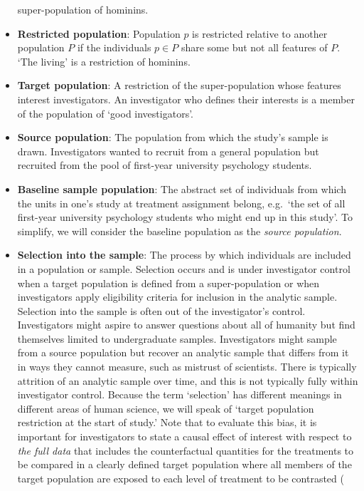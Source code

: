 \documentclass[
  single column]{article}
\begin{document}
\begin{itemize}
  super-population of hominins.
\item
  \textbf{Restricted population}: Population \(p\) is restricted
  relative to another population \(P\) if the individuals \(p \in P\)
  share some but not all features of \(P\). `The living' is a
  restriction of hominins.
\item
  \textbf{Target population}: A restriction of the super-population
  whose features interest investigators. An investigator who defines
  their interests is a member of the population of `good investigators'.
\item
  \textbf{Source population}: The population from which the study's
  sample is drawn. Investigators wanted to recruit from a general
  population but recruited from the pool of first-year university
  psychology students.
\item
  \textbf{Baseline sample population}: The abstract set of individuals
  from which the units in one's study at treatment assignment belong,
  e.g.~`the set of all first-year university psychology students who
  might end up in this study'. To simplify, we will consider the
  baseline population as the \emph{source population}.
\item
  \textbf{Selection into the sample}: The process by which individuals
  are included in a population or sample. Selection occurs and is under
  investigator control when a target population is defined from a
  super-population or when investigators apply eligibility criteria for
  inclusion in the analytic sample. Selection into the sample is often
  out of the investigator's control. Investigators might aspire to
  answer questions about all of humanity but find themselves limited to
  undergraduate samples. Investigators might sample from a source
  population but recover an analytic sample that differs from it in ways
  they cannot measure, such as mistrust of scientists. There is
  typically attrition of an analytic sample over time, and this is not
  typically fully within investigator control. Because the term
  `selection' has different meanings in different areas of human
  science, we will speak of `target population restriction at the start
  of study.' Note that to evaluate this bias, it is important for
  investigators to state a causal effect of interest with respect to
  \emph{the full data} that includes the counterfactual quantities for
  the treatments to be compared in a clearly defined target population
  where all members of the target population are exposed to each level
  of treatment to be contrasted (
\end{itemize}
\end{document}
